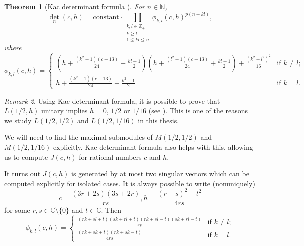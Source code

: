 \documentclass[a4paper, 12pt, reqno]{amsart}
\newtheorem{theorem}{Theorem}[section]
\theoremstyle{remark}
\newtheorem{remark}[theorem]{Remark}
\numberwithin{equation}{subsection}
\begin{document}
\begin{theorem}[Kac determinant formula {\cite[Theorem 4.2]{iohara_representation_2011}}]
  \label{thr:32}
  For $n \in \mathbb{N}$,
  \begin{equation*}
    \textstyle\det_n(c, h) = \displaystyle\text{constant}\cdot \prod_{\substack{k, l \in \mathbb{Z}_+ \\ k \ge l \\ 1 \le kl \le n}} \phi_{k, l}(c, h)^{p(n - kl)},
  \end{equation*}
  where
  \begin{equation*}
    \phi_{k, l}(c, h)=
    \begin{cases}
      (h + \frac{(k^2 - 1)(c - 13)}{24} + \frac{kl - 1}{2})(h + \frac{(l^2 - 1)(c - 13)}{24} + \frac{kl - 1}{2}) + \frac{(k^2 - l^2)^2}{16} &\text{if }k \neq l;\\
      h + \frac{(k^2 - 1)(c - 13)}{24} + \frac{k^2 - 1}{2} &\text{if }k = l.
    \end{cases}
  \end{equation*}
\end{theorem}

\begin{remark}
  \label{rmk:27}
  Using Kac determinant formula, it is possible to prove that $L(1/2, h)$ unitary implies $h = 0$, $1/2$ or $1/16$ (see \cite[\S3]{kac_bombay_2013}).
  This is one of the reasons we study $L(1/2, 1/2)$ and $L(1/2, 1/16)$ in this thesis.
\end{remark}

We will need to find the maximal submodules of $M(1/2, 1/2)$ and $M(1/2, 1/16)$ explicitly.
Kac determinant formula also helps with this, allowing us to compute $J(c, h)$ for rational numbers $c$ and $h$.

It turns out $J(c, h)$ is generated by at most two singular vectors which can be computed explicitly for isolated cases.
It is always possible to write (nonuniquely)
\begin{equation*}
  c = \frac{(3r + 2s)(3s + 2r)}{rs}, h = \frac{(r + s)^2 - t^2}{4rs}
\end{equation*}
for some $r, s \in \mathbb{C} \setminus \{0\}$ and $t \in \mathbb{C}$.
Then
\begin{equation*}
  \phi_{k, l}(c, h) =
  \begin{cases}
    \frac{(rk + sl + t)(sk + rl + t)(rk + sl - t)(sk + rl - t)}{rs} &\text{if }k \neq l;\\
    \frac{(rk + sk + t)(rk + sk - t)}{4rs} &\text{if }k = l.
  \end{cases}
\end{equation*}
\end{document}
